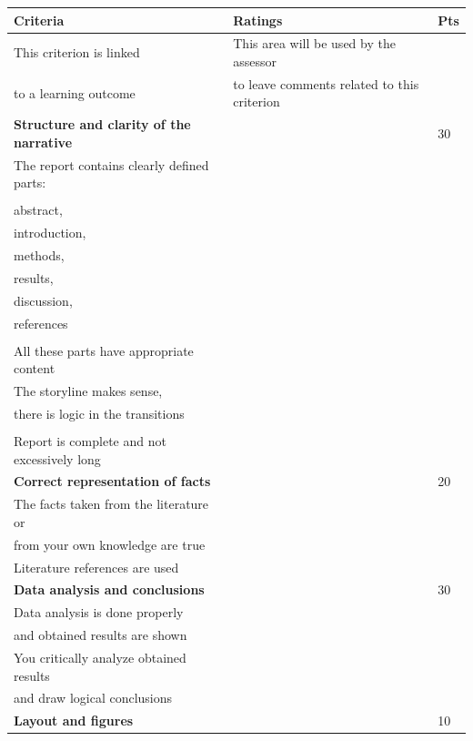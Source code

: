 \documentclass[11pt]{article} %
\begin{document}
\begin{table}
\begin{tabular}{|l | l| l|}
\hline
\textbf{Criteria}                                                                                                                                                                                                                                                & \textbf{Ratings}                                                                    & \textbf{Pts} \\
\hline
\hline
This criterion is linked & This area will be used by the assessor&\\
 to a learning outcome & to leave comments related to this criterion& \\
\hline
{\bf Structure and clarity of the narrative} &  & 30   \\
The report contains clearly defined parts:&&\\
&&\\
abstract, &&\\ 
introduction,&& \\ 
methods, &&\\
results, &&\\
discussion, &&\\
references &&\\
&&\\
All these parts have appropriate content&&\\
The storyline makes sense, &&\\
there is logic in the transitions&&\\ 
&&\\
Report is complete and not excessively long&&\\
\hline
{\bf Correct representation of facts} & & 20\\
The facts taken from the literature or &&\\
from your own knowledge are true&&\\
 Literature references are used&&\\
\hline
{\bf Data analysis and conclusions}& & 30\\
Data analysis is done properly&&\\
and obtained results are shown&&\\
You critically analyze obtained results &&\\
and draw logical conclusions&&\\
\hline
{\bf Layout and figures }& & 10\\


\end{tabular}
\end{table}
\end{document}
